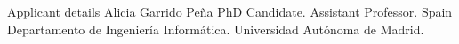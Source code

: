 \begin{rubric}{Applicant details}
Alicia Garrido Peña
PhD Candidate. Assistant Professor.
Spain
Departamento de Ingeniería Informática. Universidad Autónoma de Madrid.

\end{rubric}